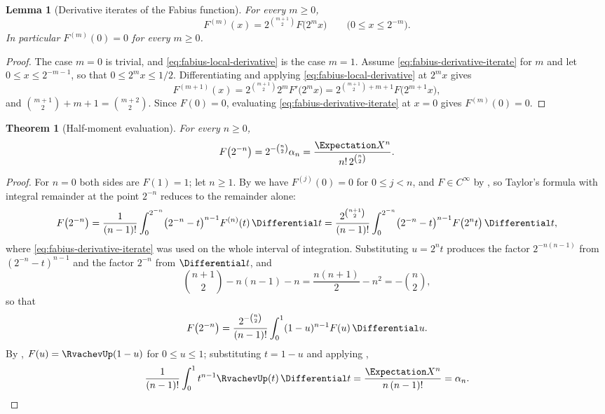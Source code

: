 \documentclass[11pt,a4paper,oneside,openany]{book}
\newtheorem{theorem}{Theorem}[chapter]
\newtheorem{lemma}[lemma]{Lemma}
\theoremstyle{definition}
\theoremstyle{remark}
\begin{document}
\begin{lemma}[Derivative iterates of the Fabius function]\label{lem:fabius-derivative-iterate}
For every $m\ge0$,
\begin{equation}\label{eq:fabius-derivative-iterate}
 F^{(m)}(x)=2^{\binom{m+1}{2}}F\bigl(2^mx\bigr)
 \qquad\bigl(0\le x\le2^{-m}\bigr).
\end{equation}
In particular $F^{(m)}(0)=0$ for every $m\ge0$.
\end{lemma}

\begin{proof}
The case $m=0$ is trivial, and \eqref{eq:fabius-local-derivative} is the case $m=1$.
Assume \eqref{eq:fabius-derivative-iterate} for $m$ and let $0\le x\le2^{-m-1}$, so that
$0\le2^mx\le1/2$.  Differentiating and applying \eqref{eq:fabius-local-derivative} at
$2^mx$ gives
\[
 F^{(m+1)}(x)=2^{\binom{m+1}{2}}2^mF'\bigl(2^mx\bigr)
 =2^{\binom{m+1}{2}+m+1}F\bigl(2^{m+1}x\bigr),
\]
and $\binom{m+1}{2}+m+1=\binom{m+2}{2}$.  Since $F(0)=0$, evaluating
\eqref{eq:fabius-derivative-iterate} at $x=0$ gives $F^{(m)}(0)=0$.
\end{proof}

\begin{theorem}[Half-moment evaluation]\label{thm:fabius-half-moment}
For every $n\ge0$,
\begin{equation}\label{eq:fabius-half-moment}
 F\bigl(2^{-n}\bigr)=2^{-\binom n2}\alpha_n
 =\frac{\Expectation X^n}{n!\,2^{\binom n2}} .
\end{equation}
\end{theorem}

\begin{proof}
For $n=0$ both sides are $F(1)=1$; let $n\ge1$.  By
 we have $F^{(j)}(0)=0$ for $0\le j<n$, and
$F\in C^\infty$ by , so Taylor's formula with integral
remainder at the point $2^{-n}$ reduces to the remainder alone:
\[
 F\bigl(2^{-n}\bigr)
 =\frac1{(n-1)!}\int_0^{2^{-n}}\bigl(2^{-n}-t\bigr)^{n-1}F^{(n)}(t)\,\Differential t
 =\frac{2^{\binom{n+1}{2}}}{(n-1)!}
   \int_0^{2^{-n}}\bigl(2^{-n}-t\bigr)^{n-1}F\bigl(2^nt\bigr)\,\Differential t,
\]
where \eqref{eq:fabius-derivative-iterate} was used on the whole interval of integration.
Substituting $u=2^nt$ produces the factor $2^{-n(n-1)}$ from $(2^{-n}-t)^{n-1}$ and the
factor $2^{-n}$ from $\Differential t$, and
\[
 \binom{n+1}{2}-n(n-1)-n=\frac{n(n+1)}2-n^2=-\binom n2 ,
\]
so that
\[
 F\bigl(2^{-n}\bigr)=\frac{2^{-\binom n2}}{(n-1)!}\int_0^1(1-u)^{n-1}F(u)\,\Differential u .
\]
By , $F(u)=\RvachevUp(1-u)$ for $0\le u\le1$; substituting
$t=1-u$ and applying ,
\[
 \frac1{(n-1)!}\int_0^1t^{n-1}\RvachevUp(t)\,\Differential t
 =\frac{\Expectation X^n}{n\,(n-1)!}
 =\alpha_n. \qedhere
\]
\end{proof}
\end{document}
